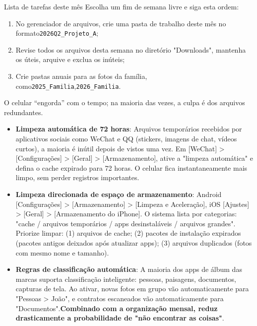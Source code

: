 \begin{tcbpractice}{Lista de tarefas deste mês}
Escolha um fim de semana livre e siga esta ordem:

\begin{enumerate}
  \item No gerenciador de arquivos, crie uma pasta de trabalho deste mês no formato\texttt{2026Q2\_Projeto\_A};
  \item Revise todos os arquivos desta semana no diretório "Downloads", mantenha os úteis, arquive e exclua os inúteis;
  \item Crie pastas anuais para as fotos da família, como\texttt{2025\_Familia},\texttt{2026\_Familia}.
\end{enumerate}

\end{tcbpractice}


O celular “engorda” com o tempo; na maioria das vezes, a culpa é dos arquivos redundantes.

\begin{itemize}
  \item \textbf{Limpeza automática de 72 horas}: Arquivos temporários recebidos por aplicativos sociais como WeChat e QQ (stickers, imagens de chat, vídeos curtos), a maioria é inútil depois de vistos uma vez. Em [WeChat] > [Configurações] > [Geral] > [Armazenamento], ative a "limpeza automática" e defina o cache expirado para 72 horas. O celular fica instantaneamente mais limpo, sem perder registros importantes.
  \item \textbf{Limpeza direcionada de espaço de armazenamento}: Android [Configurações] > [Armazenamento] > [Limpeza e Aceleração], iOS [Ajustes] > [Geral] > [Armazenamento do iPhone]. O sistema lista por categorias: "cache / arquivos temporários / apps desinstaláveis / arquivos grandes". Priorize limpar: (1) arquivos de cache; (2) pacotes de instalação expirados (pacotes antigos deixados após atualizar apps); (3) arquivos duplicados (fotos com mesmo nome e tamanho).
  \item \textbf{Regras de classificação automática}: A maioria dos apps de álbum das marcas suporta classificação inteligente: pessoas, paisagens, documentos, capturas de tela. Ao ativar, novas fotos em grupo vão automaticamente para "Pessoas > João", e contratos escaneados vão automaticamente para "Documentos".\textbf{Combinado com a organização mensal, reduz drasticamente a probabilidade de "não encontrar as coisas"}.
\end{itemize}

